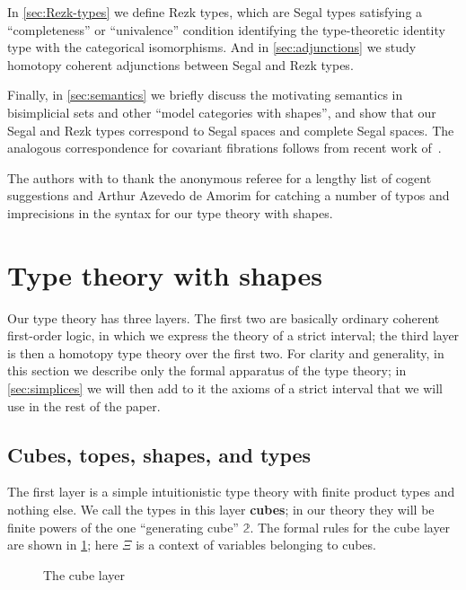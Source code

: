 \documentclass{amsart}
\theoremstyle{plain}
\theoremstyle{definition}
\theoremstyle{remark}
\numberwithin{equation}{section}
\newcommand{\types}{\vdash}
\newcommand{\unittype}{\ensuremath{\mathbf{1}}}
\newcommand{\cube}{\;\mathsf{cube}}
\newcommand{\pair}[1]{\langle #1\rangle}
\newcommand{\two}{\mathbb{2}}
\begin{document}
In \cref{sec:Rezk-types} we define Rezk types, which are Segal types satisfying a ``completeness'' or ``univalence'' condition identifying the type-theoretic identity type with the categorical isomorphisms.
And in \cref{sec:adjunctions} we study homotopy coherent adjunctions between Segal and Rezk types.

Finally, in \cref{sec:semantics} we briefly discuss the motivating semantics in bisimplicial sets and other ``model categories with shapes'', and show that our Segal and Rezk types correspond to Segal spaces and complete Segal spaces.
The analogous correspondence for covariant fibrations follows from recent work of~\cite{RV4,kv:yoneda-css,boavida:segr,rasekh:yoneda-ss}.

The authors with to thank the anonymous referee for a lengthy list of cogent suggestions and Arthur Azevedo de Amorim for catching a number of typos and imprecisions in the syntax for our type theory with shapes.


\section{Type theory with shapes}
\label{sec:shape-type-theory}

Our type theory has three layers.
The first two are basically ordinary coherent first-order logic, in which we express the theory of a strict interval; the third layer is then a homotopy type theory over the first two.
For clarity and generality, in this section we describe only the formal apparatus of the type theory; in \cref{sec:simplices} we will then add to it the axioms of a strict interval that we will use in the rest of the paper.

\subsection{Cubes, topes, shapes, and types}

The first layer is a simple intuitionistic type theory with finite product types and nothing else.
We call the types in this layer \textbf{cubes}; in our theory they will be finite powers of the one ``generating cube'' $\two$.
The formal rules for the cube layer are shown in \cref{fig:cubes}; here $\Xi$ is a context of variables belonging to cubes.

\begin{figure}
  \centering
  \caption{The cube layer}
  \label{fig:cubes}
\end{figure}
\end{document}
